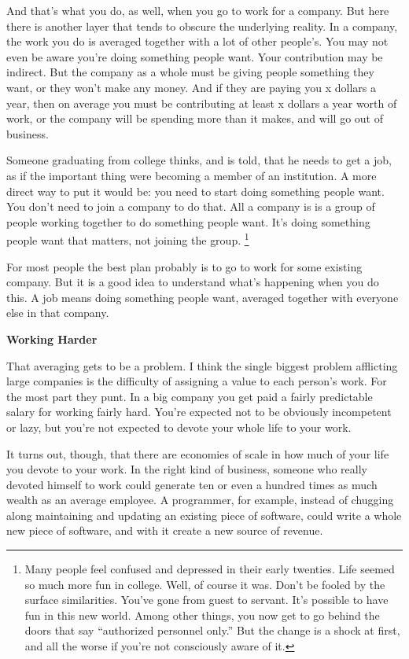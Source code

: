 And that's what you do, as well, when you go to work for a company. But
here there is another layer that tends to obscure the underlying
reality. In a company, the work you do is averaged together with a lot
of other people's. You may not even be aware you're doing something
people want. Your contribution may be indirect. But the company as a
whole must be giving people something they want, or they won't make any
money. And if they are paying you x dollars a year, then on average you
must be contributing at least x dollars a year worth of work, or the
company will be spending more than it makes, and will go out of
business.

Someone graduating from college thinks, and is told, that he needs to
get a job, as if the important thing were becoming a member of an
institution. A more direct way to put it would be: you need to start
doing something people want. You don't need to join a company to do
that. All a company is is a group of people working together to do
something people want. It's doing something people want that matters,
not joining the group. \footnote{Many people feel confused and depressed in their early twenties.
Life seemed so much more fun in college. Well, of course it was. Don't
be fooled by the surface similarities. You've gone from guest to
servant. It's possible to have fun in this new world. Among other
things, you now get to go behind the doors that say ``authorized
personnel only.'' But the change is a shock at first, and all the worse
if you're not consciously aware of it.}

For most people the best plan probably is to go to work for some
existing company. But it is a good idea to understand what's happening
when you do this. A job means doing something people want, averaged
together with everyone else in that company.

\textbf{Working Harder}

That averaging gets to be a problem. I think the single biggest problem
afflicting large companies is the difficulty of assigning a value to
each person's work. For the most part they punt. In a big company you
get paid a fairly predictable salary for working fairly hard. You're
expected not to be obviously incompetent or lazy, but you're not
expected to devote your whole life to your work.

It turns out, though, that there are economies of scale in how much of
your life you devote to your work. In the right kind of business,
someone who really devoted himself to work could generate ten or even a
hundred times as much wealth as an average employee. A programmer, for
example, instead of chugging along maintaining and updating an existing
piece of software, could write a whole new piece of software, and with
it create a new source of revenue.

